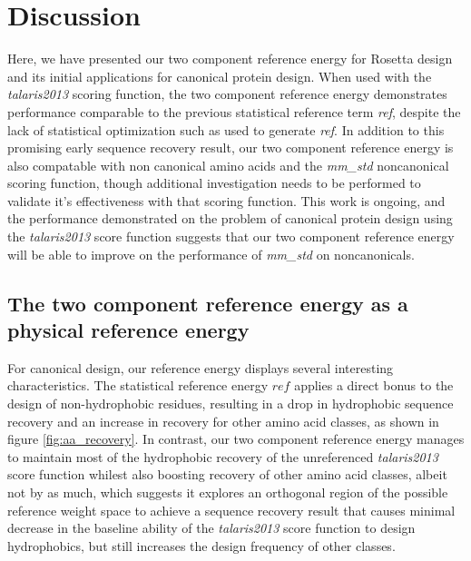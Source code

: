 \section{Discussion}

Here, we have presented our two component reference energy for Rosetta design and its initial applications for canonical protein design.
When used with the \textit{talaris2013} scoring function, the two component reference energy demonstrates performance comparable to the previous statistical reference term \textit{ref}, despite the lack of statistical optimization such as used to generate \textit{ref}\cite{leaver-fay_chapter_2013}.
In addition to this promising early sequence recovery result, our two component reference energy is also compatable with non canonical amino acids and the \textit{mm\_std} noncanonical scoring function, though additional investigation needs to be performed to validate it's effectiveness with that scoring function.
This work is ongoing, and the performance demonstrated on the problem of canonical protein design using the \textit{talaris2013} score function suggests that our two component reference energy will be able to improve on the performance of \textit{mm\_std} on noncanonicals.

\subsection{The two component reference energy as a physical reference energy}
For canonical design, our reference energy displays several interesting characteristics.
The statistical reference energy $ref$ applies a direct bonus to the design of non-hydrophobic residues, resulting in a drop in hydrophobic sequence recovery and an increase in recovery for other amino acid classes, as shown in figure \ref{fig:aa_recovery}.
In contrast, our two component reference energy manages to maintain most of the hydrophobic recovery of the unreferenced \textit{talaris2013} score function whilest also boosting recovery of other amino acid classes, albeit not by as much, which suggests it explores an orthogonal region of the possible reference weight space to achieve a sequence recovery result that causes minimal decrease in the baseline ability of the \textit{talaris2013} score function to design hydrophobics, but still increases the design frequency of other classes.

